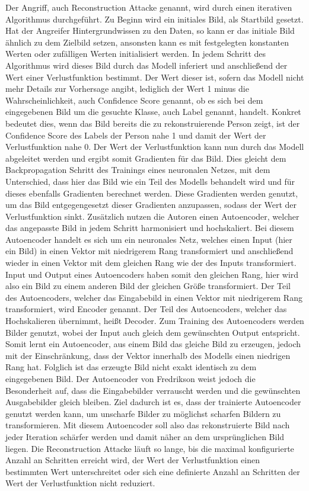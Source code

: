 Der Angriff, auch Reconstruction Attacke genannt, wird durch einen iterativen Algorithmus durchgeführt.
Zu Beginn wird ein initiales Bild, als Startbild gesetzt. 
Hat der Angreifer Hintergrundwissen zu den Daten, so kann er das initiale Bild ähnlich zu dem Zielbild setzen, ansonsten kann es mit festgelegten konstanten Werten oder zufälligen Werten initialisiert werden. 
In jedem Schritt des Algorithmus wird dieses Bild durch das Modell inferiert und anschließend der Wert einer Verlustfunktion bestimmt.
Der Wert dieser ist, sofern das Modell nicht mehr Details zur Vorhersage angibt, lediglich der Wert 1 minus die Wahrscheinlichkeit, auch Confidence Score genannt, ob es sich bei dem eingegebenen Bild um die gesuchte Klasse, auch Label genannt, handelt.
Konkret bedeutet dies, wenn das Bild bereits die zu rekonstruierende Person zeigt, ist der Confidence Score des Labels der Person nahe 1 und damit der Wert der Verlustfunktion nahe 0.
Der Wert der Verlustfunktion kann nun durch das Modell abgeleitet werden und ergibt somit Gradienten für das Bild.
Dies gleicht dem Backpropagation Schritt des Trainings eines neuronalen Netzes, mit dem Unterschied, dass hier das Bild wie ein Teil des Modells behandelt wird und für dieses ebenfalls Gradienten berechnet werden.
Diese Gradienten werden genutzt, um das Bild entgegengesetzt dieser Gradienten anzupassen, sodass der Wert der Verlustfunktion sinkt.
Zusätzlich nutzen die Autoren einen Autoencoder, welcher das angepasste Bild in jedem Schritt harmonisiert und hochskaliert.
Bei diesem Autoencoder handelt es sich um ein neuronales Netz, welches einen Input (hier ein Bild) in einen Vektor mit niedrigerem Rang transformiert und anschließend wieder in einen Vektor mit dem gleichen Rang wie der des Inputs transformiert.
Input und Output eines Autoencoders haben somit den gleichen Rang, hier wird also ein Bild zu einem anderen Bild der gleichen Größe transformiert.
Der Teil des Autoencoders, welcher das Eingabebild in einen Vektor mit niedrigerem Rang transformiert, wird Encoder genannt. 
Der Teil des Autoencoders, welcher das Hochskalieren übernimmt, heißt Decoder.
Zum Training des Autoencoders werden Bilder genutzt, wobei der Input auch gleich dem gewünschten Output entspricht. 
Somit lernt ein Autoencoder, aus einem Bild das gleiche Bild zu erzeugen, jedoch mit der Einschränkung, dass der Vektor innerhalb des Modells einen niedrigen Rang hat.
Folglich ist das erzeugte Bild nicht exakt identisch zu dem eingegebenen Bild.
Der Autoencoder von Fredrikson \etal \cite{P-3} weist jedoch die Besonderheit auf, dass die Eingabebilder verrauscht werden und die gewünschten Ausgabebilder gleich bleiben.
Ziel dadurch ist es, dass der trainierte Autoencoder genutzt werden kann, um unscharfe Bilder zu möglichst scharfen Bildern zu transformieren.
Mit diesem Autoencoder soll also das rekonstruierte Bild nach jeder Iteration schärfer werden und damit näher an dem ursprünglichen Bild liegen.
Die Reconstruction Attacke läuft so lange, bis die maximal konfigurierte Anzahl an Schritten erreicht wird, der Wert der Verlustfunktion einen bestimmten Wert unterschreitet oder sich eine definierte Anzahl an Schritten der Wert der Verlustfunktion nicht reduziert.

